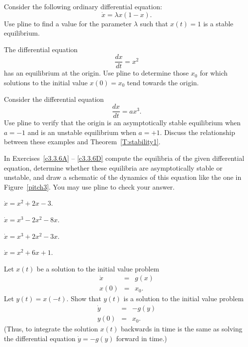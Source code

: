 \documentclass{ximera}
\begin{document}
\begin{exercise} \label{c3.3.3}
Consider the following ordinary differential equation:
\[
\dot{x} = \lambda x(1-x).
\]
Use {\sf pline} to find a value for the parameter $\lambda$ such
that $x(t)=1$ is a stable equilibrium.
\end{exercise}

\begin{exercise} \label{c3.3.4}
The differential equation
\[
\frac{dx}{dt} =  x^2
\]
has an equilibrium at the origin.  Use {\sf pline} to determine
those $x_0$ for which solutions to the initial value $x(0)=x_0$ tend
towards the origin.
\end{exercise}

\begin{exercise} \label{c3.3.5}
Consider the differential equation
\[
\frac{dx}{dt} = a x^3.
\]
Use {\sf pline} to verify that the origin is an asymptotically
stable equilibrium when $a = -1$ and is an unstable
equilibrium when $a = +1$. Discuss the relationship
between these examples and Theorem~\ref{T:stability1}.
\end{exercise}

\TEXER


\noindent In Exercises~\ref{c3.3.6A} -- \ref{c3.3.6D} compute the equilibria 
of the given differential equation, determine whether these equilibria are 
asymptotically stable or unstable, and draw a sche\-ma\-tic of the dynamics 
of this equation like the one in Figure~\ref{pitch3}.  You may use {\sf pline}
to check your answer.
\begin{exercise} \label{c3.3.6A}
$\dot{x} = x^2 + 2x - 3$.
\end{exercise}
\begin{exercise} \label{c3.3.6B}
$\dot{x} = x^3 - 2x^2 - 8x$.
\end{exercise}
\begin{exercise} \label{c3.3.6C}
$\dot{x} = x^3 + 2x^2 - 3x$.
\end{exercise}
\begin{exercise} \label{c3.3.6D}
$\dot{x} = x^2 + 6x + 1$.
\end{exercise}

\begin{exercise} \label{c3.3.7}
Let $x(t)$ be a solution to the initial value problem
\begin{eqnarray*}
\dot{x} & = & g(x) \\
x(0) & = & x_0.
\end{eqnarray*}
Let $y(t)=x(-t)$.  Show that $y(t)$ is a solution to the
initial value problem
\begin{eqnarray*}
\dot{y} & = & -g(y) \\
y(0) & = & x_0.
\end{eqnarray*}
(Thus, to integrate the solution $x(t)$ backwards in time is the
same as solving the differential equation $\dot{y}  =  -g(y)$
forward in time.)
\end{exercise}
\end{document}
